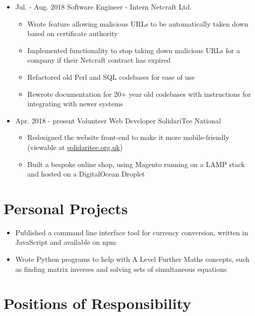 \documentclass[11pt,a4paper,sans]{moderncv}        %
\begin{document}
\begin{itemize}

\item{
\cventry
{Jul. - Aug. 2018}
{Software Engineer - Intern}
{Netcraft Ltd.}
{}{}{
\begin{itemize}
\item Wrote feature allowing malicious URLs to be automatically taken down based on certificate authority
\item Implemented functionality to stop taking down malicious URLs for a company if their Netcraft contract has expired
\item Refactored old Perl and SQL codebases for ease of use
\item Rewrote documentation for 20+ year old codebases with instructions for integrating with newer systems
\end{itemize}
}}

\item{
\cventry
{Apr. 2018 - present}
{Volunteer Web Developer}
{SolidariTee National}
{}{}{
\begin{itemize}
\item Redesigned the website front-end to make it more mobile-friendly (viewable at \href{https://www.solidaritee.org.uk/}{solidaritee.org.uk})
\item Built a bespoke online shop, using Magento running on a LAMP stack and hosted on a DigitalOcean Droplet
\end{itemize}
}}

\end{itemize}

\section{Personal Projects}

\begin{itemize}

\item Published a command line interface tool for currency conversion, written in JavaScript and available on npm

\item Wrote Python programs to help with A Level Further Maths concepts, such as finding matrix inverses and solving sets of simultaneous equations

\end{itemize}

\section{Positions of Responsibility}
\end{document}

